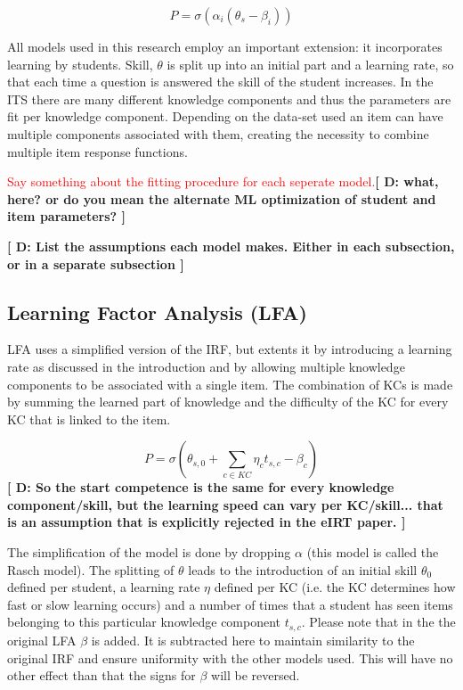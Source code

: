 \documentclass{scrartcl}
\newcommand\todo[1]{\textcolor{red}{#1}}
\providecommand{\comm}[1]{{\bf[ #1 ]}}
\providecommand{\commd}[1]{\comm{D: {#1}}}
\begin{document}
\begin{equation}
\label{eq:irt}
P = \sigma(\alpha_{i} (\theta_{s} - \beta_{i}))
\end{equation}

All models used in this research employ an important extension: it incorporates learning by students. Skill, $\theta$ is split up into an initial part and a learning rate, so that each time a question is answered the skill of the student increases. In the ITS there are many different knowledge components and thus the parameters are fit per knowledge component. Depending on the data-set used an item can have multiple components associated with them, creating the necessity to combine multiple item response functions.

\todo{Say something about the fitting procedure for each seperate model.}\commd{what, here? or do you mean the alternate ML optimization of student and item parameters? }

\commd{List the assumptions each model makes. Either in each subsection, or in a separate subsection}

\subsection{Learning Factor Analysis (LFA)}
\label{sec:LFA}


LFA uses a simplified version of the IRF, but extents it by introducing a learning rate as discussed in the introduction and by allowing multiple knowledge components to be associated with a single item. The combination of KCs is made by summing the learned part of knowledge and the difficulty of the KC for every KC that is linked to the item.

\begin{equation}
P = \sigma(\theta_{s,0} + \sum_{c \in KC}  \eta_{c} t_{s,c} - \beta_{c})
\end{equation}
\commd{So the start competence is the same for every knowledge component/skill, but the learning speed can vary per KC/skill... that is an assumption that is explicitly rejected in the eIRT paper.}

The simplification of the model is done by dropping $\alpha$ (this model is called the Rasch model). The splitting of $\theta$ leads to the introduction of an initial skill $\theta_{0}$ defined per student, a learning rate $\eta$ defined per KC (i.e. the KC determines how fast or slow learning occurs) and a number of times that a student has seen items belonging to this particular knowledge component $t_{s,c}$. Please note that in the the original LFA $\beta$ is added. It is subtracted here to maintain similarity to the original IRF and ensure uniformity with the other models used. This will have no other effect than that the signs for $\beta$ will be reversed.
\end{document}
